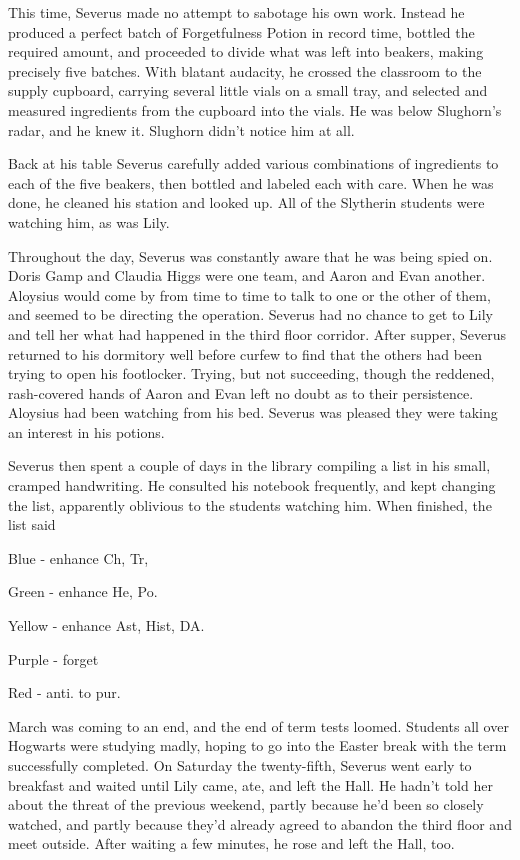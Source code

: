 \documentclass[a4paper,11pt]{article}
\begin{document}
This time, Severus made no attempt to sabotage his own work. Instead he produced a perfect batch of Forgetfulness Potion in record time, bottled the required amount, and proceeded to divide what was left into beakers, making precisely five batches. With blatant audacity, he crossed the classroom to the supply cupboard, carrying several little vials on a small tray, and selected and measured ingredients from the cupboard into the vials. He was below Slughorn's radar, and he knew it. Slughorn didn't notice him at all.

Back at his table Severus carefully added various combinations of ingredients to each of the five beakers, then bottled and labeled each with care. When he was done, he cleaned his station and looked up. All of the Slytherin students were watching him, as was Lily.

Throughout the day, Severus was constantly aware that he was being spied on. Doris Gamp and Claudia Higgs were one team, and Aaron and Evan another. Aloysius would come by from time to time to talk to one or the other of them, and seemed to be directing the operation. Severus had no chance to get to Lily and tell her what had happened in the third floor corridor. After supper, Severus returned to his dormitory well before curfew to find that the others had been trying to open his footlocker. Trying, but not succeeding, though the reddened, rash-covered hands of Aaron and Evan left no doubt as to their persistence. Aloysius had been watching from his bed. Severus was pleased they were taking an interest in his potions.

Severus then spent a couple of days in the library compiling a list in his small, cramped handwriting. He consulted his notebook frequently, and kept changing the list, apparently oblivious to the students watching him. When finished, the list said

Blue - enhance Ch, Tr,

Green - enhance He, Po.

Yellow - enhance Ast, Hist, DA.

Purple - forget

Red - anti. to pur.

March was coming to an end, and the end of term tests loomed. Students all over Hogwarts were studying madly, hoping to go into the Easter break with the term successfully completed. On Saturday the twenty-fifth, Severus went early to breakfast and waited until Lily came, ate, and left the Hall. He hadn't told her about the threat of the previous weekend, partly because he'd been so closely watched, and partly because they'd already agreed to abandon the third floor and meet outside. After waiting a few minutes, he rose and left the Hall, too.
\end{document}
